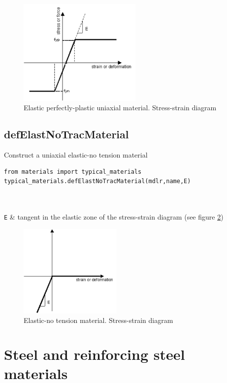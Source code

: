 \begin{figure}[h]
\centering
\includegraphics[width=60mm]{materials/figures/ElasticPP}
\caption{Elastic perfectly-plastic uniaxial material. Stress-strain diagram}\label{ElasticPP}
\end{figure}

\subsection{defElastNoTracMaterial}
\noindent Construct a uniaxial elastic-no tension material
\begin{verbatim}
from materials import typical_materials
typical_materials.defElastNoTracMaterial(mdlr,name,E)
\end{verbatim}
\begin{paramFuncTable}
\mdlr{} \\
 \\
{\tt E} & tangent in the elastic zone of the stress-strain diagram (see figure \ref{ENT}) \\
\end{paramFuncTable}

\begin{figure}[h]
\centering
\includegraphics[width=50mm]{materials/figures/ENT}
\caption{Elastic-no tension material. Stress-strain diagram}\label{ENT}
\end{figure}

\section{Steel and reinforcing steel materials}
